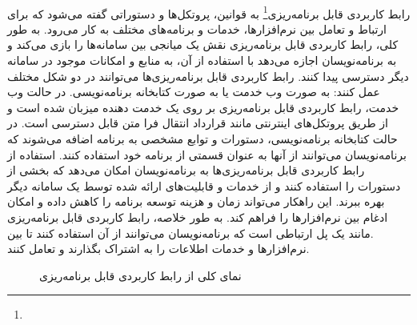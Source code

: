 \paragraph{}
{
    رابط کاربردی قابل برنامه‌ریزی\footnote{} به قوانین، پروتکل‌ها و دستوراتی گفته می‌شود که برای ارتباط و 
    تعامل بین نرم‌افزارها، خدمات و برنامه‌های مختلف به کار می‌رود. به طور کلی، رابط کاربردی قابل برنامه‌ریزی نقش یک میانجی بین سامانه‌ها را بازی
    می‌کند و به برنامه‌نویسان اجازه می‌دهد با استفاده از آن، به منابع و امکانات موجود در سامانه دیگر دسترسی پیدا کنند. رابط کاربردی قابل برنامه‌ریزی‌ها
    می‌توانند در دو شکل مختلف عمل کنند: به صورت وب خدمت یا به صورت کتابخانه برنامه‌نویسی. در حالت وب خدمت، رابط کاربردی قابل برنامه‌ریزی بر روی
    یک خدمت دهنده‌ میزبان شده است و از طریق پروتکل‌های اینترنتی مانند قرارداد انتقال فرا متن قابل دسترسی است. در حالت کتابخانه برنامه‌نویسی، دستورات و توابع مشخصی به
    برنامه اضافه می‌شوند که برنامه‌نویسان می‌توانند از آنها به عنوان قسمتی از برنامه خود استفاده کنند. استفاده از رابط کاربردی قابل برنامه‌ریزی‌ها
    به برنامه‌نویسان امکان می‌دهد که بخشی از دستورات را استفاده کنند و از خدمات و قابلیت‌های ارائه شده توسط یک سامانه دیگر بهره ببرند. این 
    راهکار می‌تواند زمان و هزینه توسعه برنامه را کاهش داده و امکان ادغام بین نرم‌افزارها را فراهم کند. به طور خلاصه، رابط کاربردی قابل برنامه‌ریزی
    .مانند یک پل ارتباطی است که برنامه‌نویسان می‌توانند از آن استفاده کنند تا بین نرم‌افزارها و خدمات اطلاعات را به اشتراک بگذارند و تعامل کنند.
    \begin{figure}[H]
        \caption{نمای کلی از رابط کاربردی قابل برنامه‌ریزی}
        \label{fig:api}
    \end{figure}
}

